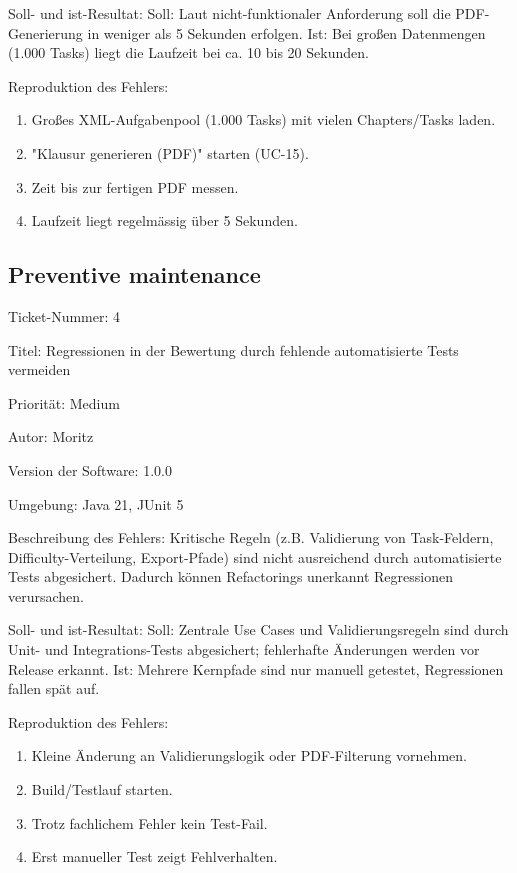 \documentclass[a4paper]{article}
\begin{document}
Soll- und ist-Resultat: Soll: Laut nicht-funktionaler Anforderung soll die PDF-Generierung in weniger als 5 Sekunden erfolgen. Ist: Bei großen Datenmengen (1.000 Tasks) liegt die Laufzeit bei ca. 10 bis 20 Sekunden.

Reproduktion des Fehlers: 

\begin{enumerate}
    \item Großes XML-Aufgabenpool (1.000 Tasks) mit vielen Chapters/Tasks laden.
    \item "Klausur generieren (PDF)" starten (UC-15).
    \item Zeit bis zur fertigen PDF messen.
    \item Laufzeit liegt regelmässig über 5 Sekunden.
\end{enumerate}

\subsection*{Preventive maintenance}

Ticket-Nummer: 4

Titel: Regressionen in der Bewertung durch fehlende automatisierte Tests vermeiden

Priorität: Medium

Autor: Moritz

Version der Software: 1.0.0

Umgebung: Java 21, JUnit 5

Beschreibung des Fehlers: Kritische Regeln (z.B. Validierung von Task-Feldern, Difficulty-Verteilung, Export-Pfade) sind nicht ausreichend durch automatisierte Tests abgesichert. Dadurch können Refactorings unerkannt Regressionen verursachen.

Soll- und ist-Resultat: Soll: Zentrale Use Cases und Validierungsregeln sind durch Unit- und Integrations-Tests abgesichert; fehlerhafte Änderungen werden vor Release erkannt. Ist: Mehrere Kernpfade sind nur manuell getestet, Regressionen fallen spät auf.

Reproduktion des Fehlers: 

\begin{enumerate}
    \item Kleine Änderung an Validierungslogik oder PDF-Filterung vornehmen.
    \item Build/Testlauf starten.
    \item Trotz fachlichem Fehler kein Test-Fail.
    \item Erst manueller Test zeigt Fehlverhalten.
\end{enumerate}
\end{document}
